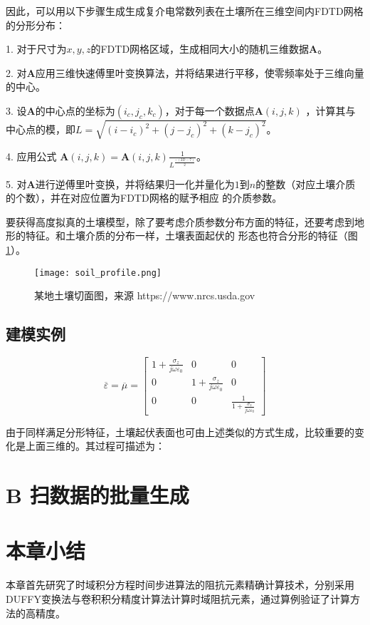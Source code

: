 因此，可以用以下步骤生成生成复介电常数列表在土壤所在三维空间内FDTD网格的分形分布：

1. 对于尺寸为$x,y,z$的FDTD网格区域，生成相同大小的随机三维数据$\mathbf{A}$。

2. 对$\mathbf{A}$应用三维快速傅里叶变换算法，并将结果进行平移，使零频率处于三维向量
的中心。

3. 设$\mathbf{A}$的中心点的坐标为$(i_c,j_c,k_c)$，对于每一个数据点$\mathbf{A}(i,j,k)$
，计算其与中心点的模，即$L=\sqrt{(i - i_c)^2 + (j - j_c)^2 + (k - j_c)^2}$。

4. 应用公式 $\mathbf{A}(i,j,k) = \mathbf{A}(i,j,k) \frac{1}{L^{\frac{-(2 D-7)}{2}}}$。

5. 对$\mathbf{A}$进行逆傅里叶变换，并将结果归一化并量化为$1$到$n$的整数（对应土壤介质的个数），并在对应位置为FDTD网格的赋予相应
的介质参数。

要获得高度拟真的土壤模型，除了要考虑介质参数分布方面的特征，还要考虑到地形的特征。和土壤介质的分布一样，土壤表面起伏的
形态也符合分形的特征（图\ref{soil_profile}）。
\begin{figure}[htbp]
	\texttt{[image: soil\_profile.png]}
	\caption{某地土壤切面图，来源 https://www.nrcs.usda.gov}
	\label{soil_profile}
\end{figure}
\subsection{建模实例}
\begin{equation} 
\overline{\varepsilon}=\overline{\mu}=\left[ \begin{array}{ccc}{1+\frac{\sigma_{z}}{j \omega \varepsilon_{0}}} & {0} & {0} \\ {0} & {1+\frac{\sigma_{z}}{j \omega \varepsilon_{0}}} & {0} \\ {0} & {0} & {\frac{1}{1+\frac{\sigma_{z}}{j \omega \varepsilon_{0}}}}\end{array}\right]
\end{equation}

由于同样满足分形特征，土壤起伏表面也可由上述类似的方式生成，比较重要的变化是上面三维的。其过程可描述为：


\section{B 扫数据的批量生成}
\section{本章小结}
本章首先研究了时域积分方程时间步进算法的阻抗元素精确计算技术，分别采用DUFFY变换法与卷积积分精度计算法计算时域阻抗元素，通过算例验证了计算方法的高精度。

